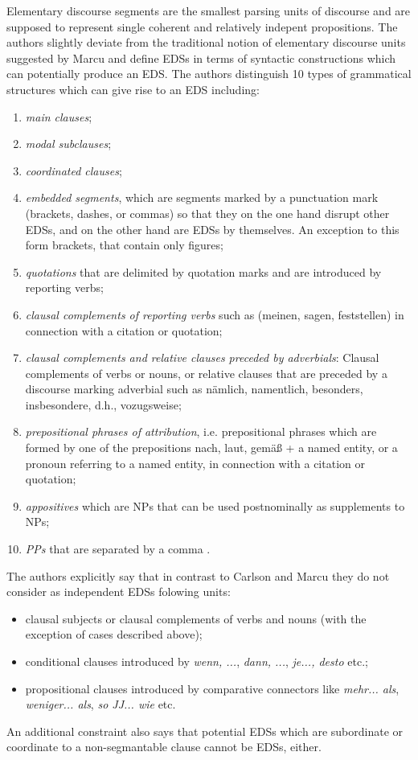 \documentclass[a4paper,11pt]{article}
\begin{document}
Elementary discourse segments are the smallest parsing units of
discourse and are supposed to represent single coherent and relatively
indepent propositions.  The authors slightly deviate from the
traditional notion of elementary discourse units suggested by Marcu
\cite{Marcu-99} and define EDSs in terms of syntactic constructions
which can potentially produce an EDS.  The authors distinguish 10
types of grammatical structures which can give rise to an EDS
including:
\begin{enumerate}
  \item \textit{main clauses};
  \item \textit{modal subclauses};
  \item \textit{coordinated clauses};
  \item \textit{embedded segments}, which are segments marked by a punctuation
    mark (brackets, dashes, or commas) so that they on the one hand disrupt
    other EDSs, and on the other hand are EDSs by themselves.  An exception to
    this form brackets, that contain only figures;
  \item \textit{quotations} that are delimited by quotation marks and are
    introduced by reporting verbs;
  \item \textit{clausal complements of reporting verbs} such as (meinen,
    sagen, feststellen) in connection with a citation or quotation;
  \item \textit{clausal complements and relative clauses preceded by
    adverbials}: Clausal complements of verbs or nouns, or relative clauses
    that are preceded by a discourse marking adverbial such as n\"amlich,
    namentlich, besonders, insbesondere, d.h., vozugsweise;
  \item \textit{prepositional phrases of attribution}, i.e. prepositional
    phrases which are formed by one of the prepositions nach, laut, gem\"a\ss
    + a named entity, or a pronoun referring to a named entity, in connection
    with a citation or quotation;
  \item \textit{appositives} which are NPs that can be used postnominally as
    supplements to NPs;
  \item \textit{PPs} that are separated by a comma .
\end{enumerate}

The authors explicitly say that in contrast to Carlson and Marcu
\cite{Carlson-Marcu-01} they do not consider as independent EDSs folowing
units:
\begin{itemize}
  \item clausal subjects or clausal complements of verbs and nouns (with the
    exception of cases described above);
  \item conditional clauses introduced by \textit{wenn, ...}, \textit{dann,
    ...}, \textit{je..., desto} etc.;
  \item propositional clauses introduced by comparative connectors like
    \textit{mehr... als}, \textit{weniger... als}, \textit{so JJ... wie} etc.
\end{itemize}
An additional constraint also says that potential EDSs which are subordinate
or coordinate to a non-segmantable clause cannot be EDSs, either.
\end{document}

